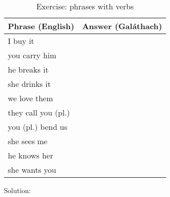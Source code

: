 \begin{table}[H]
\centering
\begin{tabu}{|l|M{10.0cm}|}
  \toprule
  \textbf{Phrase (English)} & \textbf{Answer (Gal\'{a}thach)}\\
  \toprule
  I buy it & \\
  \midrule
  you carry him & \\
  \midrule
  he breaks it & \\
  \midrule
  she drinks it & \\
  \midrule
  we love them & \\
  \midrule
  they call you (pl.) & \\
  \midrule
  you (pl.) bend us & \\
  \midrule
  she sees me & \\
  \midrule
  he knows her & \\
  \midrule
  she wants you & \\
  \bottomrule
\end{tabu}
\label{exercise_phrases_with_verbs}
\caption{Exercise: phrases with verbs}
\end{table}

\newpage
Solution:
\begin{table}[H]
\centering
{}
\label{solution_phrases_with_verbs}
\caption{Solution: phrases with verbs}
\end{table}
\newpage

